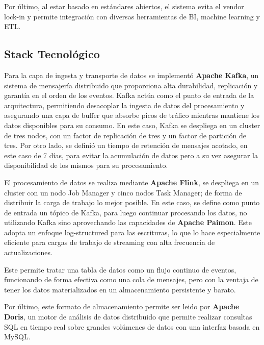 Por último, al estar basado en estándares abiertos, el sistema evita el vendor lock-in 
y permite integración con diversas herramientas de BI, machine learning y ETL.

\newpage
\subsection{Stack Tecnológico}
Para la capa de ingesta y transporte de datos se implementó \textbf{Apache Kafka}, 
un sistema de mensajería distribuido que proporciona alta durabilidad, replicación y garantía en el orden de los eventos. 
Kafka actúa como el punto de entrada de la arquitectura, permitiendo desacoplar la ingesta de datos del procesamiento 
y asegurando una capa de buffer que absorbe picos de tráfico mientras mantiene los datos disponibles para su consumo.
En este caso, Kafka se despliega en un cluster de tres nodos, con un factor de replicación de tres y un factor de partición de tres.
Por otro lado, se definió un tiempo de retención de mensajes acotado, en este caso de 7 días, para evitar la acumulación de datos
pero a su vez asegurar la disponibilidad de los mismos para su procesamiento.\newline

El procesamiento de datos se realiza mediante \textbf{Apache Flink}, se despliega en un cluster con un nodo Job Manager 
y cinco nodos Task Manager; de forma de distribuir la carga de trabajo lo mejor posible.
En este caso, se define como punto de entrada un tópico de Kafka, para luego continuar procesando los datos, 
no utilizando Kafka sino aprovechando las capacidades de \textbf{Apache Paimon}. 
Este adopta un enfoque log-structured para las escrituras, 
lo que lo hace especialmente eficiente para cargas de trabajo de streaming con alta frecuencia de actualizaciones.\newline

Este permite tratar una tabla de datos como un flujo continuo de eventos, funcionando de forma efectiva como 
una cola de mensajes, pero con la ventaja de tener los datos materializados en un almacenamiento persistente y barato.\newline

Por último, este formato de almacenamiento permite ser leido por \textbf{Apache Doris}, un motor de análisis de datos
distribuido que permite realizar consultas SQL en tiempo real sobre grandes volúmenes de datos con una interfaz basada en MySQL.\newline

